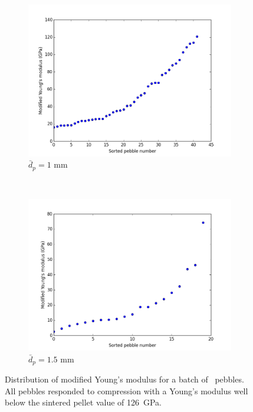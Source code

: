 \begin{figure}
        \centering
        \begin{subfigure}[b]{\doubleimagewidth}
                \includegraphics[width=\textwidth]{chapters/figures/nfri-1mm-E-plot.png}
                \caption{$\bar{d}_p = 1$ mm}
                \label{fig:nfri-1mm-E-plot}
        \end{subfigure}
        ~
        \begin{subfigure}[b]{\doubleimagewidth}
                \includegraphics[width=\textwidth]{chapters/figures/nfri-1.5mm-E-plot.png}
                \caption{$\bar{d}_p = 1.5$ mm}
                \label{fig:nfri-1.5mm-E-plot}
        \end{subfigure}
        \caption{Distribution of modified Young's modulus for a batch of \lit~pebbles. All pebbles responded to compression with a Young's modulus well below the sintered pellet value of \si{126 GPa}.}\label{fig:nfri-E-plot}
\end{figure}


